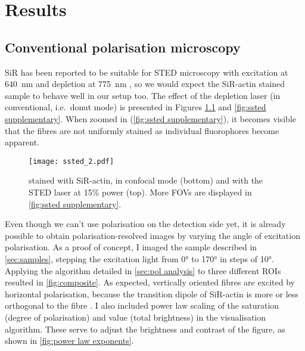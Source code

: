 \chapter{Results}

\section{Conventional polarisation microscopy}
\label{sec:conventional pol}

SiR has been reported to be suitable for STED microscopy with excitation at 640~nm and depletion at 775~nm \cite{DEste2015}, so we would expect the SiR-actin stained sample to behave well in our setup too. The effect of the depletion laser (in conventional, i.e.~donut mode) is presented in Figures \ref{fig:ssted} and \ref{fig:ssted supplementary}. When zoomed in (\autoref{fig:ssted supplementary}), it becomes visible that the fibres are not uniformly stained as individual fluorophores become apparent.

\begin{figure}
	\centering
	\texttt{[image: ssted\_2.pdf]}
	\caption{
	 stained with SiR-actin, in confocal mode (bottom) and with the STED laser at 15\% power (top). More FOVs are displayed in \autoref{fig:ssted supplementary}.
	}
	\label{fig:ssted}
\end{figure}

Even though we can't use polarisation on the detection side yet, it is already possible to obtain polarisation-resolved images by varying the angle of excitation polarisation. As a proof of concept, I imaged the sample described in \autoref{sec:samples}, stepping the excitation light from \ang{0} to \ang{170} in steps of \ang{10}. Applying the algorithm detailed in \autoref{sec:pol analysis} to three different ROIs resulted in \autoref{fig:composite}. As expected, vertically oriented fibres are excited by horizontal polarisation, because the transition dipole of SiR-actin is more or less orthogonal to the fibre \cite{Spira2017}.
I also included power law scaling of the saturation (degree of polarisation) and value (total brightness) in the visualisation algorithm. These serve to adjust the brightness and contrast of the figure, as shown in \autoref{fig:power law exponents}.

